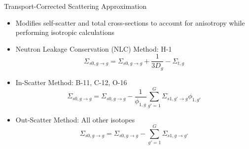 \begin{frame}[t]{Transport-Corrected Scattering Approximation}
    
    \begin{itemize}
        \item Modifies self-scatter and total cross-sections to account for 
        anisotropy while performing isotropic calculations
        \item Neutron Leakage Conservation (NLC) Method: H-1
        \begin{equation*}
        \Sigma_{s0,g\rightarrow g} = \Sigma_{s0,g\rightarrow g} + \frac{1}{3D_g} 
        - \Sigma_{t,g}
        \end{equation*}
        \item In-Scatter Method: B-11, C-12, O-16
        \begin{equation*}
        \Sigma_{s0,g\rightarrow g} = \Sigma_{s0,g\rightarrow g} - 
        \frac{1}{\phi_{1,g}}\sum_{g'=1}^G \Sigma_{s1,g'\rightarrow g}\phi_{1,g'}
        \end{equation*}
        \item Out-Scatter Method: All other isotopes
        \begin{equation*}
        \Sigma_{s0,g\rightarrow g} = \Sigma_{s0,g\rightarrow g} - \sum_{g'=1}^G 
        \Sigma_{s1,g\rightarrow g'}
        \end{equation*}
    \end{itemize}
    
\end{frame}


